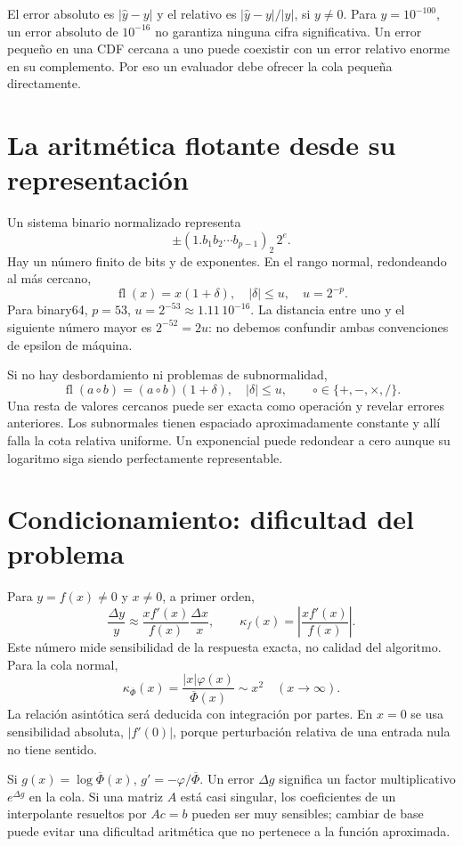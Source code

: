\documentclass[11pt,a4paper]{article}
\theoremstyle{definition}
\DeclareMathOperator{\fl}{fl}
\newcommand{\ph}{\varphi}
\newcommand{\Q}{\overline\Phi}
\newcounter{problema}
\begin{document}
El error absoluto es $|\widehat y-y|$ y el relativo es $|\widehat y-y|/|y|$, si $y\ne0$. Para $y=10^{-100}$, un error absoluto de $10^{-16}$ no garantiza ninguna cifra significativa. Un error pequeño en una CDF cercana a uno puede coexistir con un error relativo enorme en su complemento. Por eso un evaluador debe ofrecer la cola pequeña directamente.

\section{La aritmética flotante desde su representación}
Un sistema binario normalizado representa
\[
\pm(1.b_1b_2\cdots b_{p-1})_2\,2^e.
\]
Hay un número finito de bits y de exponentes. En el rango normal, redondeando al más cercano,
\[
\fl(x)=x(1+\delta),\quad |\delta|\le u,\quad u=2^{-p}.
\]
Para binary64, $p=53$, $u=2^{-53}\approx1.11\,10^{-16}$. La distancia entre uno y el siguiente número mayor es $2^{-52}=2u$: no debemos confundir ambas convenciones de epsilon de máquina.

Si no hay desbordamiento ni problemas de subnormalidad,
\[
\fl(a\circ b)=(a\circ b)(1+\delta),\quad |\delta|\le u,
\qquad \circ\in\{+,-,\times,/\}.
\]
Una resta de valores cercanos puede ser exacta como operación y revelar errores anteriores. Los subnormales tienen espaciado aproximadamente constante y allí falla la cota relativa uniforme. Un exponencial puede redondear a cero aunque su logaritmo siga siendo perfectamente representable.

\section{Condicionamiento: dificultad del problema}
Para $y=f(x)\ne0$ y $x\ne0$, a primer orden,
\[
\frac{\Delta y}{y}\approx\frac{xf'(x)}{f(x)}\frac{\Delta x}x,
\qquad \kappa_f(x)=\left|\frac{xf'(x)}{f(x)}\right|.
\]
Este número mide sensibilidad de la respuesta exacta, no calidad del algoritmo. Para la cola normal,
\[
\kappa_{\Q}(x)=\frac{|x|\ph(x)}{\Q(x)}\sim x^2\quad(x\to\infty).
\]
La relación asintótica será deducida con integración por partes. En $x=0$ se usa sensibilidad absoluta, $|f'(0)|$, porque perturbación relativa de una entrada nula no tiene sentido.

Si $g(x)=\log\Q(x)$, $g'=-\ph/\Q$. Un error $\Delta g$ significa un factor multiplicativo $e^{\Delta g}$ en la cola. Si una matriz $A$ está casi singular, los coeficientes de un interpolante resueltos por $Ac=b$ pueden ser muy sensibles; cambiar de base puede evitar una dificultad aritmética que no pertenece a la función aproximada.
\end{document}
